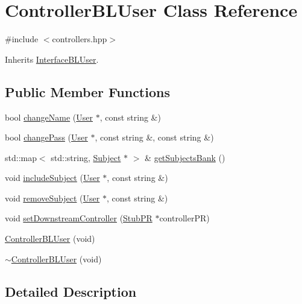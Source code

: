 \hypertarget{class_controller_b_l_user}{}\section{Controller\+B\+L\+User Class Reference}
\label{class_controller_b_l_user}


{\ttfamily \#include $<$controllers.\+hpp$>$}



Inherits \hyperlink{class_interface_b_l_user}{Interface\+B\+L\+User}.

\subsection*{Public Member Functions}
\begin{DoxyCompactItemize}
\item 
bool \hyperlink{class_controller_b_l_user_a8fb74fe44753778c8bf820f51737dd76}{change\+Name} (\hyperlink{class_user}{User} $\ast$, const string \&)
\item 
bool \hyperlink{class_controller_b_l_user_a90ac2cdd863f28b57b6e7d27ff4ede0c}{change\+Pass} (\hyperlink{class_user}{User} $\ast$, const string \&, const string \&)
\item 
std\+::map$<$ std\+::string, \hyperlink{class_subject}{Subject} $\ast$ $>$ \& \hyperlink{class_controller_b_l_user_a2f422b6fdb912d9bec90af7de56e7656}{get\+Subjects\+Bank} ()
\item 
void \hyperlink{class_controller_b_l_user_acece0a3e60fb4fbf748783f1370e9d79}{include\+Subject} (\hyperlink{class_user}{User} $\ast$, const string \&)
\item 
void \hyperlink{class_controller_b_l_user_aaed19dcb20672c4bfe3c98f18d1c0a2e}{remove\+Subject} (\hyperlink{class_user}{User} $\ast$, const string \&)
\item 
void \hyperlink{class_controller_b_l_user_a4594159d854a4bbb2aef17e7ef688821}{set\+Downstream\+Controller} (\hyperlink{class_stub_p_r}{Stub\+PR} $\ast$controller\+PR)
\item 
\hyperlink{class_controller_b_l_user_a27e5d4017b659576bc6b0b77f533d139}{Controller\+B\+L\+User} (void)
\item 
\hyperlink{class_controller_b_l_user_aa16e2866d7ca11aa8b5bea2f07e4b379}{$\sim$\+Controller\+B\+L\+User} (void)
\end{DoxyCompactItemize}


\subsection{Detailed Description}


